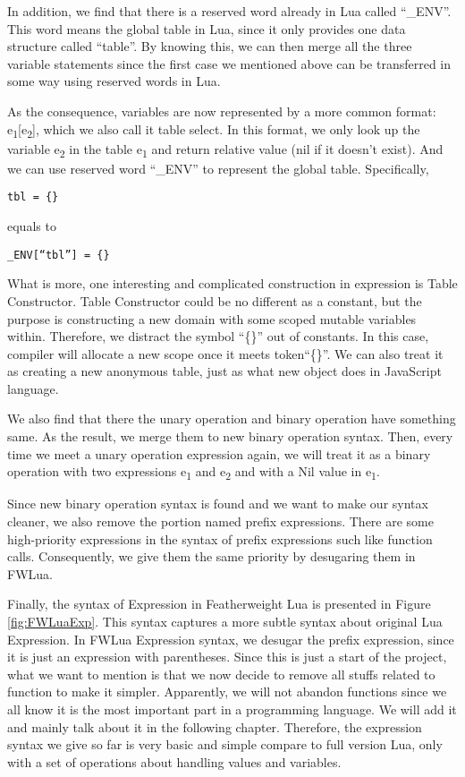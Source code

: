 In addition, we find that there is a reserved word already in Lua called ``\_ENV''. This word means the global table in Lua, since it only provides one data structure called ``table''. By knowing this, we can then merge all the three variable statements since the first case we mentioned above can be transferred in some way using reserved words in Lua.

As the consequence, variables are now represented by a more common format: e\textsubscript{1}[e\textsubscript{2}], which we also call it table select. In this format, we only look up the variable e\textsubscript{2} in the table e\textsubscript{1} and return relative value (nil if it doesn't exist). And we can use reserved word ``\_ENV'' to represent the global table. Specifically,
\begin{flushleft}
\tt tbl = \{\}\\
\end{flushleft}
equals to
\begin{flushleft}
\tt \_ENV[``tbl''] = \{\}\\
\end{flushleft}

What is more, one interesting and complicated construction in expression is Table Constructor. Table Constructor could be no different as a constant, but the purpose is constructing a new domain with some scoped mutable variables within. Therefore, we distract the symbol ``\{\}'' out of constants. In this case, compiler will allocate a new scope once it meets token``\{\}''. We can also treat it as creating a new anonymous table, just as what new object does in JavaScript language.

We also find that there the unary operation and binary operation have something same. As the result, we merge them to new binary operation syntax. Then, every time we meet a unary operation expression again, we will treat it as a binary operation with two expressions e\textsubscript{1} and e\textsubscript{2} and with a Nil value in e\textsubscript{1}.

Since new binary operation syntax is found and we want to make our syntax cleaner, we also remove the portion named prefix expressions. There are some high-priority expressions in the syntax of prefix expressions such like function calls. Consequently, we give them the same priority by desugaring them in FWLua.

Finally, the syntax of Expression in Featherweight Lua is presented in Figure \ref{fig:FWLuaExp}. This syntax captures a more subtle syntax about original Lua Expression. In FWLua Expression syntax, we desugar the prefix expression, since it is just an expression with parentheses. Since this is just a start of the project, what we want to mention is that we now decide to remove all stuffs related to function to make it simpler. Apparently, we will not abandon functions since we all know it is the most important part in a programming language. We will add it and mainly talk about it in the following chapter. Therefore, the expression syntax we give so far is very basic and simple compare to full version Lua, only with a set of operations about handling values and variables.


